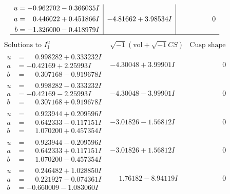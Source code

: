 \documentclass[1p]{elsarticle_modified}
\theoremstyle{definition}
\newcommand{\I}{\sqrt{-1}}
\begin{document}
$$\begin{array}{c|c|c}
\begin{aligned}
u &= -0.962702 - 0.366035 I \\
a &= \phantom{-}0.446022 + 0.451866 I \\
b &= -1.326000 - 0.418979 I\end{aligned}
 & -4.81662 + 3.98534 I & \phantom{-0.000000 } 0\\
 \hline 
 \end{array}$$\newpage$$\begin{array}{c|c|c}  
\text{Solutions to }I^u_{1}& \I (\text{vol} + \sqrt{-1}CS) & \text{Cusp shape}\\
 \hline 
\begin{aligned}
u &= \phantom{-}0.998282 + 0.333232 I \\
a &= -0.42169 + 2.25993 I \\
b &= \phantom{-}0.307168 - 0.919678 I\end{aligned}
 & -4.30048 + 3.99901 I & \phantom{-0.000000 } 0 \\ \hline\begin{aligned}
u &= \phantom{-}0.998282 - 0.333232 I \\
a &= -0.42169 - 2.25993 I \\
b &= \phantom{-}0.307168 + 0.919678 I\end{aligned}
 & -4.30048 - 3.99901 I & \phantom{-0.000000 } 0 \\ \hline\begin{aligned}
u &= \phantom{-}0.923944 + 0.209596 I \\
a &= \phantom{-}0.642333 - 0.117151 I \\
b &= \phantom{-}1.070200 + 0.457354 I\end{aligned}
 & -3.01826 - 1.56812 I & \phantom{-0.000000 } 0 \\ \hline\begin{aligned}
u &= \phantom{-}0.923944 - 0.209596 I \\
a &= \phantom{-}0.642333 + 0.117151 I \\
b &= \phantom{-}1.070200 - 0.457354 I\end{aligned}
 & -3.01826 + 1.56812 I & \phantom{-0.000000 } 0 \\ \hline\begin{aligned}
u &= \phantom{-}0.246482 + 1.028850 I \\
a &= \phantom{-}0.221927 - 0.074361 I \\
b &= -0.660009 - 1.083060 I\end{aligned}
 & \phantom{-}1.76182 - 8.94119 I & \phantom{-0.000000 } 0 \\ \hline\begin{aligned}

\end{aligned}
\end{array}$$
\end{document}
